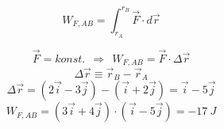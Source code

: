 

$$W_{F,AB}=\int_{r_A}^{r_B} \vec{F}\cdot d\vec{r} $$

$$\vec{F}=konst.   \ \ \Rightarrow \ \    W_{F,AB}=\vec{F}\cdot\Delta\vec{r} $$
$$\Delta\vec{r}\equiv\vec{r}_B-\vec{r}_A $$
$$\Delta\vec{r}=(2\vec{i} - 3\vec{j}) - (\vec{i} + 2\vec{j} )=\vec{i} - 5\vec{j} $$
$$ W_{F,AB}= (3\vec{i} + 4\vec{j})\cdot(\vec{i} - 5\vec{j}) = -17\ J $$

